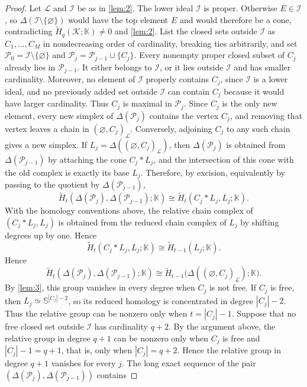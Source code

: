 \documentclass[11pt]{amsart}
\theoremstyle{definition}
\newcommand{\kk}{\mathbb K}
\newcommand{\cL}{\mathcal L}
\newcommand{\cI}{\mathcal I}
\begin{document}
\begin{proof}
Let $\cL$ and $\cI$ be as in \cref{lem:2}. The lower ideal $\cI$ is proper. Otherwise $E\in\cI$, so $\Delta(\cI\setminus\{\varnothing\})$ would have the top element $E$ and would therefore be a cone, contradicting $\widetilde H_q(\mathcal K;\kk)\ne0$ and \cref{lem:2}. List the closed sets outside $\cI$ as $C_1,\dots,C_M$ in nondecreasing order of cardinality, breaking ties arbitrarily, and set $\mathcal P_0=\cI\setminus\{\varnothing\}$ and $\mathcal P_j=\mathcal P_{j-1}\cup\{C_j\}$. Every nonempty proper closed subset of $C_j$ already lies in $\mathcal P_{j-1}$. It either belongs to $\cI$, or it lies outside $\cI$ and has smaller cardinality. Moreover, no element of $\cI$ properly contains $C_j$, since $\cI$ is a lower ideal, and no previously added set outside $\cI$ can contain $C_j$ because it would have larger cardinality. Thus $C_j$ is maximal in $\mathcal P_j$. Since $C_j$ is the only new element, every new simplex of $\Delta(\mathcal P_j)$ contains the vertex $C_j$, and removing that vertex leaves a chain in $(\varnothing,C_j)_{\cL}$. Conversely, adjoining $C_j$ to any such chain gives a new simplex. If $L_j=\Delta((\varnothing,C_j)_{\cL})$, then $\Delta(\mathcal P_j)$ is obtained from $\Delta(\mathcal P_{j-1})$ by attaching the cone $C_j*L_j$, and the intersection of this cone with the old complex is exactly its base $L_j$. Therefore, by excision, equivalently by passing to the quotient by $\Delta(\mathcal P_{j-1})$,
\[
\widetilde H_t(\Delta(\mathcal P_j),\Delta(\mathcal P_{j-1});\kk)
\cong
\widetilde H_t(C_j*L_j,L_j;\kk).
\]
With the homology conventions above, the relative chain complex of $(C_j*L_j,L_j)$ is obtained from the reduced chain complex of $L_j$ by shifting degrees up by one. Hence
\[
\widetilde H_t(C_j*L_j,L_j;\kk)
\cong
\widetilde H_{t-1}(L_j;\kk).
\]
Hence
\[
\widetilde H_t(\Delta(\mathcal P_j),\Delta(\mathcal P_{j-1});\kk)
\cong
\widetilde H_{t-1}
\bigl(\Delta((\varnothing,C_j)_{\cL});\kk\bigr).
\]
By \cref{lem:3}, this group vanishes in every degree when $C_j$ is not free. If $C_j$ is free, then $L_j\simeq \mathbb{S}^{|C_j|-2}$, so its reduced homology is concentrated in degree $|C_j|-2$. Thus the relative group can be nonzero only when $t=|C_j|-1$. Suppose that no free closed set outside $\cI$ has cardinality $q+2$. By the argument above, the relative group in degree $q+1$ can be nonzero only when $C_j$ is free and $|C_j|-1=q+1$, that is, only when $|C_j|=q+2$. Hence the relative group in degree $q+1$ vanishes for every $j$. The long exact sequence of the pair $(\Delta(\mathcal P_j),\Delta(\mathcal P_{j-1}))$ contains

\end{proof}
\end{document}
